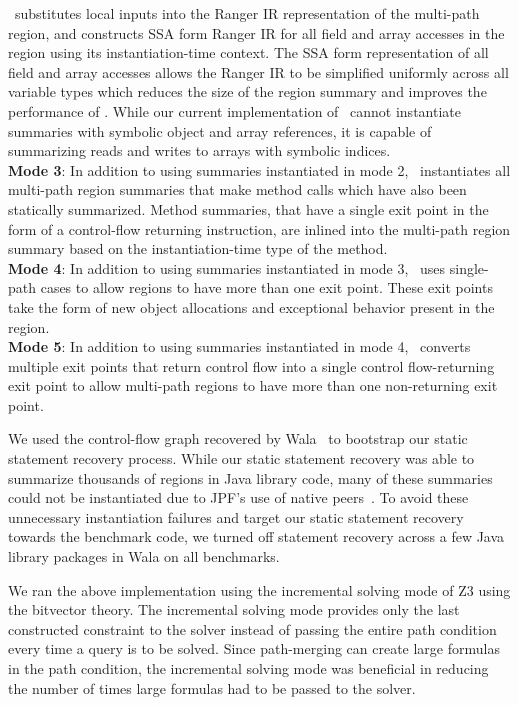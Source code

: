 %
\tool\ substitutes local inputs into the Ranger IR representation of the multi-path region, and constructs SSA form
Ranger IR for all field and array accesses in the region using its instantiation-time context.
%
The SSA form representation of all field and array accesses allows the Ranger IR to be simplified uniformly across all
variable types which reduces the size of the region summary and improves the performance of \tool.
%
While our current implementation of \tool\ cannot instantiate summaries with symbolic object and array
references, it is capable of summarizing reads and writes to arrays with symbolic indices.\\
%
\textbf{Mode 3}: In addition to using summaries instantiated in mode 2, \tool\ instantiates all multi-path region
summaries that make method calls which have also been statically summarized.
%
Method summaries, that have a single exit point in the form of a control-flow returning instruction, are inlined into
the multi-path region summary based on the instantiation-time type of the method.\\
%
\textbf{Mode 4}: In addition to using summaries instantiated in mode 3, \tool\ uses single-path cases to allow
regions to have more than one exit point.
%
These exit points take the form of new object allocations and exceptional behavior present in the region.\\
%
\textbf{Mode 5}: In addition to using summaries instantiated in mode 4, \tool\ converts multiple exit points that return
control flow into a single control flow-returning exit point to allow multi-path regions to have more than one non-returning exit point.

We used the control-flow graph recovered by Wala~\cite{Wala} to bootstrap our static statement recovery process.
%
While our static statement recovery was able to summarize thousands of regions in Java library code, many of these
summaries could not be instantiated due to JPF\rq s use of native peers~\cite{jpf-mji}.
%
To avoid these unnecessary instantiation failures and target our static statement recovery towards the benchmark code,
we turned off statement recovery across a few Java library packages in Wala on all benchmarks.

We ran the above implementation using the incremental solving mode of Z3 using the bitvector theory.
%
The incremental solving mode provides only the last constructed constraint to the solver instead of passing the entire
path condition every time a query is to be solved.
%
Since path-merging can create large formulas in the path condition, the incremental solving mode was beneficial in
reducing the number of times large formulas had to be passed to the solver.
%
